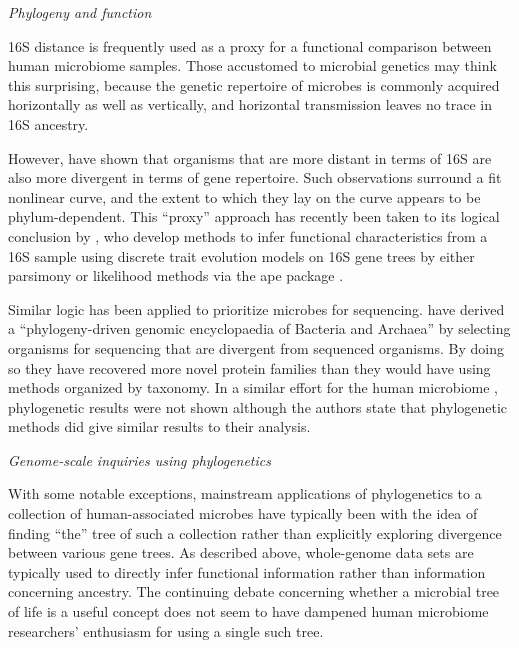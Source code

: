 \documentclass{amsart}
\renewcommand{\subsection}[1]{%
\bigskip
\begin{center}
\begin{large}
\normalfont\itshape #1
\end{large}
\end{center}}
\begin{document}
\subsection{Phylogeny and function}

16S distance is frequently used as a proxy for a functional comparison between human microbiome samples.
Those accustomed to microbial genetics may think this surprising, because the genetic repertoire of microbes is commonly acquired horizontally as well as vertically, and horizontal transmission leaves no trace in 16S ancestry.

However, \citet{zaneveld2010ribosomal} have shown that organisms that are more distant in terms of 16S are also more divergent in terms of gene repertoire.
Such observations surround a fit nonlinear curve, and the extent to which they lay on the curve appears to be phylum-dependent.
This ``proxy'' approach has recently been taken to its logical conclusion by \citet{langille2013predictive}, who develop methods to infer functional characteristics from a 16S sample using discrete trait evolution models on 16S gene trees by either parsimony \citep{kluge1969quantitative} or likelihood \citep{pagel1994detecting} methods via the ape package \citep{paradis2004ape}.

Similar logic has been applied to prioritize microbes for sequencing.
\citet{wu2009phylogeny} have derived a ``phylogeny-driven genomic encyclopaedia of Bacteria and Archaea'' by selecting organisms for sequencing that are divergent from sequenced organisms.
By doing so they have recovered more novel protein families than they would have using methods organized by taxonomy.
In a similar effort for the human microbiome \citep{fodor2012most}, phylogenetic results were not shown although the authors state that phylogenetic methods did give similar results to their analysis.


\subsection{Genome-scale inquiries using phylogenetics}
With some notable exceptions, mainstream applications of phylogenetics to a collection of human-associated microbes have typically been with the idea of finding ``the'' tree of such a collection rather than explicitly exploring divergence between various gene trees.
As described above, whole-genome data sets are typically used to directly infer functional information rather than information concerning ancestry.
The continuing debate concerning whether a microbial tree of life is a useful concept \citep{bapteste2009prokaryotic,caro2012bacterial} does not seem to have dampened human microbiome researchers' enthusiasm for using a single such tree.
\end{document}
